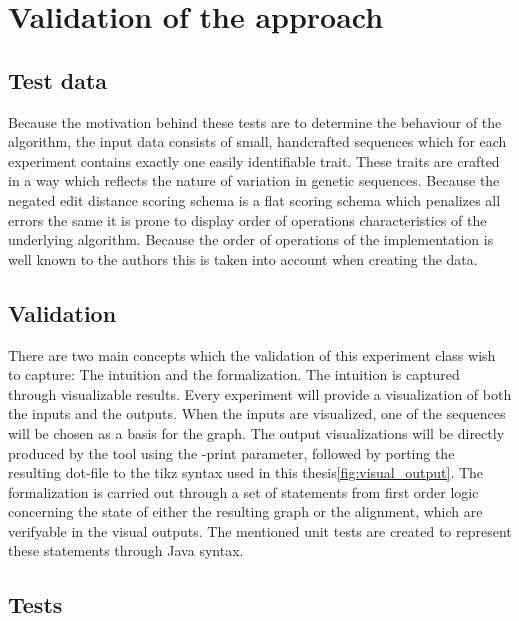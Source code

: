 \documentclass[thesis.tex]{subfiles}
\begin{document}
\chapter{Validation of the approach}
\section{Test data}
Because the motivation behind these tests are to determine the behaviour of the algorithm, the input data consists of small, handcrafted sequences which for each experiment contains exactly one easily identifiable trait. These traits are crafted in a way which reflects the nature of variation in genetic sequences. Because the negated edit distance scoring schema is a flat scoring schema which penalizes all errors the same it is prone to display order of operations characteristics of the underlying algorithm. Because the order of operations of the implementation is well known to the authors this is taken into account when creating the data.
\section{Validation}
There are two main concepts which the validation of this experiment class wish to capture: The intuition and the formalization. The intuition is captured through visualizable results. Every experiment will provide a visualization of both the inputs and the outputs. When the inputs are visualized, one of the sequences will be chosen as a basis for the graph. The output visualizations will be directly produced by the tool using the -print parameter, followed by porting the resulting dot-file to the tikz syntax used in this thesis\ref{fig:visual_output}. The formalization is carried out through a set of statements from first order logic concerning the state of either the resulting graph or the alignment, which are verifyable in the visual outputs. The mentioned unit tests are created to represent these statements through Java syntax.
\section{Tests}
\end{document}
